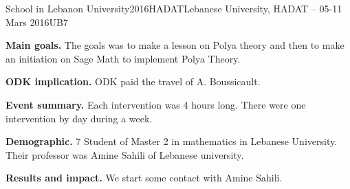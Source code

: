 \begin{event}{School in Lebanon University}{2016HADAT}{Lebanese University, HADAT -- 05-11 Mars 2016}{UB}{7}{}

\textbf{Main goals.} The goals was to make a lesson on Polya theory and then
to make an initiation on Sage Math to implement Polya Theory.

\textbf{ODK implication.} ODK paid the travel of A. Boussicault.

\textbf{Event summary.}
Each intervention was 4 hours long. There were one intervention by day during 
a week.

\textbf{Demographic.} 7 Student of Master 2 in mathematics in Lebanese University.
Their professor was Amine Sahili of Lebanese university.

\textbf{Results and impact.}
We start some contact with Amine Sahili.


\end{event}
